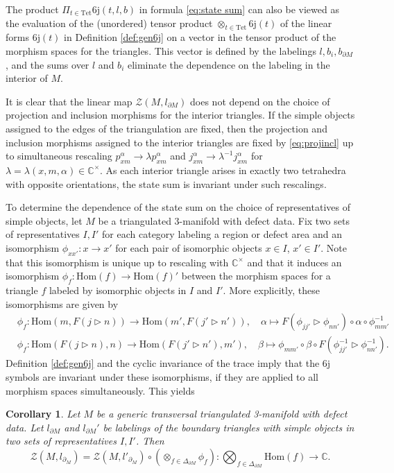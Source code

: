\documentclass[1.5pt, a4paper]{article}
\newcommand{\C}{\mathbb{C}}
\newcommand{\Hom}{\mathrm{Hom}}
\newcommand{\inv}[0]{{-1}}
\newtheorem{corollary}[theorem]{Corollary}
\begin{document}
The product $\Pi_{t\in \mathrm{Tet}} \mathrm{6j}(t,l,b)$  in formula \eqref{eq:state sum} can also be viewed as the evaluation of the (unordered) tensor product $\otimes_{t\in \mathrm{Tet}} \mathrm{6j}(t)$ of the linear forms $\mathrm{6j}(t)$ in Definition \ref{def:gen6j} on a vector in the  tensor product of the morphism spaces for  the triangles. This vector is  defined by the labelings $l,b_i, b_{\partial M}$, and the sums over $l$ and $b_i$ eliminate the dependence on the labeling in the interior of $M$.



It is clear  that the linear map $\mathcal Z(M, l_{\partial M})$ does not depend on the choice of projection and inclusion morphisms for the interior triangles. If the simple objects assigned to the edges of the triangulation are fixed, then the projection and inclusion morphisms assigned to the interior triangles are fixed by \eqref{eq:projincl} up to simultaneous rescaling $p^\alpha_{xm}\to \lambda p^\alpha_{xm}$ and $j^\alpha_{xm}\to \lambda^\inv j^\alpha_{xm}$ for $\lambda=\lambda(x,m,\alpha)\in \C^\times$. As each interior triangle arises in exactly two tetrahedra with opposite orientations, the state sum is invariant under such rescalings.

To determine the dependence of the state sum   on the choice of representatives of simple objects, let $M$ be a  triangulated 3-manifold with defect data. Fix two sets of representatives $I,I'$ for each category labeling a region or  defect area and an isomorphism $\phi_{xx'}: x\to x'$ for each pair of isomorphic objects $x\in I$, $x'\in I'$. Note that this isomorphism is unique up to rescaling with $\C^\times$ and that it induces an isomorphism $\phi_f: \Hom(f)\to \Hom(f)'$ between the morphism spaces for a triangle $f$ labeled by isomorphic objects in $I$ and $I'$. 
More explicitly, these isomorphisms are given by 
\begin{align*}
&\phi_f: \Hom(m, F(j\rhd n))\to \Hom(m', F(j'\rhd n')), \quad \alpha\mapsto F(\phi_{jj'}\rhd \phi_{nn'})\circ \alpha\circ \phi^\inv_{mm'}\\
&\phi_f: \Hom(F(j\rhd n),n)\to \Hom(F(j'\rhd n'),m'), \quad \beta \mapsto \phi_{mm'} \circ \beta\circ F(\phi_{jj'}^\inv\rhd \phi_{nn'}^\inv).
\end{align*}
Definition \ref{def:gen6j} and the cyclic invariance of the trace imply that the 6j symbols are invariant under these isomorphisms, if they are applied to all morphism spaces simultaneously.  This yields


\begin{corollary} Let $M$ be a generic transversal  triangulated 3-manifold with defect data. Let $l_{\partial M}$ and $l_{\partial M}'$ be labelings of the boundary triangles with simple objects in two sets of representatives $I,I'$. Then 
$$\mathcal Z(M,l_{\partial_M})=\mathcal Z(M,l'_{\partial_M})\circ (\otimes_{f\in \Delta_{\partial M}}\phi_f):\bigotimes_{f\in \Delta_{\partial M}}\Hom(f)\to \C.$$
\end{corollary}
\end{document}
